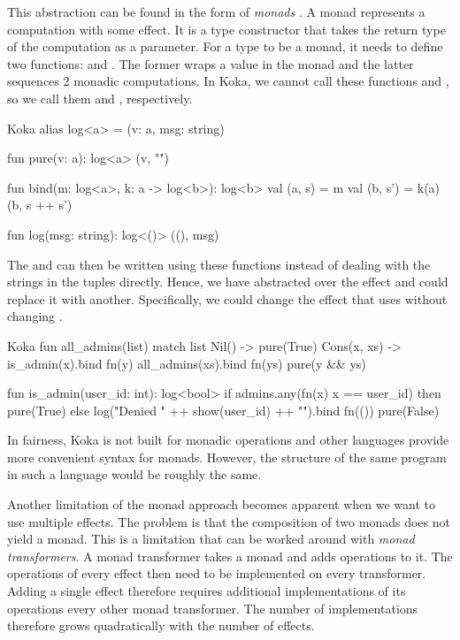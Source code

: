 This abstraction can be found in the form of \emph{monads} \autocite{wadler_essence_1992,peyton_jones_imperative_1993}. A monad represents a computation with some effect. It is a type constructor that takes the return type of the computation as a parameter. For a type to be a monad, it needs to define two functions:  and \hs{>>=}. The former wraps a value in the monad and the latter sequences 2 monadic computations. In Koka, we cannot call these functions  and \hs{>>=}, so we call them  and , respectively.

\begin{lst}{Koka}
alias log<a> = (v: a, msg: string)

fun pure(v: a): log<a>
  (v, "")

fun bind(m: log<a>, k: a -> log<b>): log<b>
  val (a, s) = m
  val (b, s') = k(a)
  (b, s ++ s')

fun log(msg: string): log<()>
  ((), msg)
\end{lst}
%
The  and  can then be written using these functions instead of dealing with the strings in the tuples directly. Hence, we have abstracted over the effect and could replace it with another. Specifically, we could change the effect that  uses without changing .

\begin{lst}{Koka}
fun all_admins(list)
  match list
    Nil() -> pure(True)
    Cons(x, xs) -> is_admin(x).bind fn(y)
      all_admins(xs).bind fn(ys)
        pure(y && ys)
  
fun is_admin(user_id: int): log<bool>
  if admins.any(fn(x) x == user_id)
  then pure(True)
  else
    log("Denied " ++ show(user_id) ++ "\n").bind fn(())
      pure(False)
\end{lst}
%
In fairness, Koka is not built for monadic operations and other languages provide more convenient syntax for monads. However, the structure of the same program in such a language would be roughly the same.

Another limitation of the monad approach becomes apparent when we want to use multiple effects. The problem is that the composition of two monads does not yield a monad. This is a limitation that can be worked around with \emph{monad transformers}. A monad transformer takes a monad and adds operations to it. The operations of every effect then need to be implemented on every transformer. Adding a single effect therefore requires additional implementations of its operations every other monad transformer. The number of implementations therefore grows quadratically with the number of effects.

